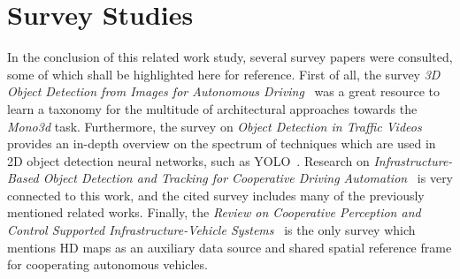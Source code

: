 \section{Survey Studies}
\label{sec:related-surveys}

In the conclusion of this related work study, several survey papers were consulted, some of which shall be highlighted here for reference.
First of all, the survey \textit{3D Object Detection from Images for Autonomous Driving}~\cite{survey2022} was a great resource to learn a taxonomy for the multitude of architectural approaches towards the \textit{Mono3d} task.
Furthermore, the survey on \textit{Object Detection in Traffic Videos} provides an in-depth overview on the spectrum of techniques which are used in 2D object detection neural networks, such as YOLO~\cite{wang2022yolov7}.
Research on \textit{Infrastructure-Based Object Detection and Tracking for Cooperative Driving Automation}~\cite{bai2022infrastructure} is very connected to this work, and the cited survey includes many of the previously mentioned related works.
Finally, the \textit{Review on Cooperative Perception and Control Supported Infrastructure-Vehicle Systems}~\cite{yu2022review} is the only survey which mentions HD maps as an auxiliary data source and shared spatial reference frame for cooperating autonomous vehicles.
